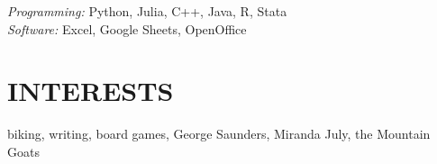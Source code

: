 \documentclass[margin, 10pt]{res} %
\begin{document}
\begin{resume}
{\sl Programming:} 
Python, Julia, C++, Java, R, Stata \\
{\sl Software:} 
Excel, Google Sheets, OpenOffice \\


\section{INTERESTS} 

biking, writing, board games, George Saunders, Miranda July, the Mountain Goats

%
%
%
%
%


\end{resume}
\end{document}
